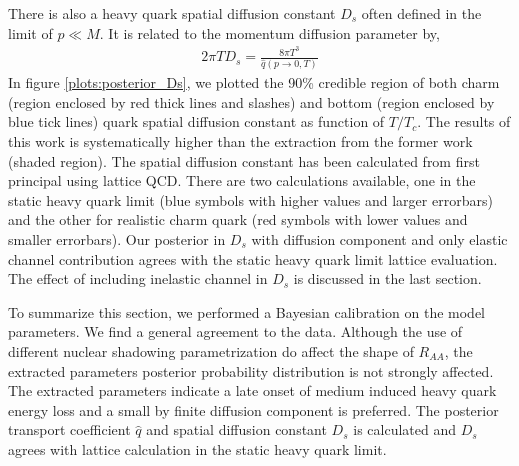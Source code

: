 \documentclass[aps, prc, reprint, amsmath, groupedaddress, nofootinbib]{revtex4-1}
\begin{document}
There is also a heavy quark spatial diffusion constant $D_s$ often defined in the limit of $p\ll M$.
It is related to the momentum diffusion parameter by,
\begin{eqnarray}
2\pi T D_s = \frac{8\pi T^3}{\hat{q}(p\rightarrow 0, T)}
\end{eqnarray}
In figure \ref{plots:posterior_Ds}, we plotted the 90\% credible region of both charm (region enclosed by red thick lines and slashes) and bottom (region enclosed by blue tick lines) quark spatial diffusion constant as function of $T/T_c$.
The results of this work is systematically higher than the extraction from the former work (shaded region).
The spatial diffusion constant has been calculated from first principal using lattice QCD.
There are two calculations available, one in the static heavy quark limit (blue symbols with higher values and larger errorbars) and the other for realistic charm quark (red symbols with lower values and smaller errorbars).
Our posterior in $D_s$ with diffusion component and only elastic channel contribution agrees with the static heavy quark limit lattice evaluation.
The effect of including inelastic channel in $D_s$ is discussed in the last section.

To summarize this section, we performed a Bayesian calibration on the model parameters. 
We find a general agreement to the data.
Although the use of different nuclear shadowing parametrization do affect the shape of $R_{AA}$, the extracted parameters posterior probability distribution is not strongly affected.
The extracted parameters indicate a late onset of medium induced heavy quark energy loss and a small by finite diffusion component is preferred.
The posterior transport coefficient $\hat{q}$ and spatial diffusion constant $D_s$ is calculated and $D_s$ agrees with lattice calculation in the static heavy quark limit. 
\end{document}
